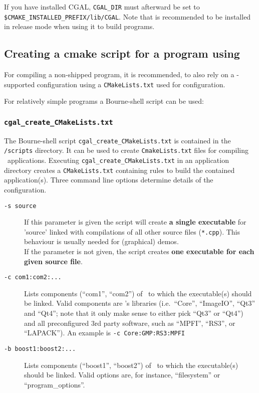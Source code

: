 If you have installed CGAL, \texttt{CGAL\_DIR} must afterward be set to
\texttt{\$CMAKE\_INSTALLED\_PREFIX/lib/CGAL}. Note that \cgal is
recommended to be installed in release mode when using it to build programs.

\subsection{Creating a cmake script for a program using \cgal}

For compiling a non-shipped program, it is
recommended, to also rely on a \cmake-supported configuration using a
\texttt{CMakeLists.txt} used for configuration. 

For relatively simple programs a Bourne-shell script can be
used:

\subsubsection{\texttt{cgal\_create\_CMakeLists.txt\label{sec:create_cgal_CMakeLists.txt}}}

The Bourne-shell script \texttt{cgal\_create\_CMakeLists.txt} is contained in the
\texttt{\cgalrel/scripts} directory. It can be used to create
\texttt{CmakeLists.txt} files for compiling \cgal\ applications. Executing
\texttt{cgal\_create\_CMakeLists.txt} in an application directory creates a
\texttt{CMakeLists.txt} containing rules to build the contained
application(s). Three command line options determine details of the
configuration.

\begin{description}
\item [\texttt{-s source}] If this parameter is given the script will
  create \textbf{a single executable} for 'source' linked with
  compilations of all other source files (\texttt{*.cpp}). This
  behaviour is usually needed for (graphical) demos. \\
  If the parameter is not given, the script creates \textbf{one executable for each given
  source file}.
\item [\texttt{-c com1:com2:...}] Lists components (``com1'',
  ``com2'') of \cgal\ to which the executable(s) should be linked. Valid components are \cgal's
  libraries (i.e.~``Core'', ``ImageIO'', ``Qt3'' and ``Qt4''; note
  that it only make sense to either pick ``Qt3'' or ``Qt4'') and all
  preconfigured 3rd party software, such as ``MPFI'', ``RS3'',
  or ``LAPACK''). An example is \texttt{-c Core:GMP:RS3:MPFI}

\item [\texttt{-b boost1:boost2:...}] Lists components (``boost1'',
  ``boost2'') of \boost\ to which the executable(s) should be
  linked. Valid options are, for instance, ``filesystem'' or ``program\_options''.

\end{description}

